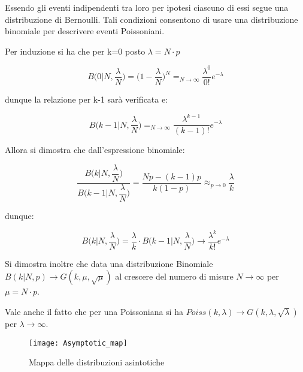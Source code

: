 \documentclass[11pt,a4paper]{book}
\begin{document}
Essendo gli eventi indipendenti tra loro per ipotesi ciascuno di essi segue una distribuzione di Bernoulli. Tali condizioni consentono di usare una distribuzione binomiale per descrivere eventi Poissoniani.

Per induzione si ha che per k=0 posto $\lambda = N \cdot p$

\begin{equation*}
	B \Big (0\vert N, \dfrac{\lambda}{N} \Big ) = \Big (1- \dfrac{\lambda}{N} \Big )^N =_{N \rightarrow \infty} \dfrac{\lambda^0}{0!}e^{-\lambda}
\end{equation*}

dunque la relazione per k-1 sar\`{a} verificata e:

\begin{equation*}
	B \Big (k-1\vert N,\frac{\lambda}{N} \Big ) =_{N \rightarrow \infty} \dfrac{\lambda^{k-1}}{(k-1)!} e^{- \lambda}
\end{equation*}

Allora si dimostra che dall'espressione binomiale:

\begin{equation*}
	\dfrac{B \Big (k  \vert N , \dfrac{\lambda}{N}\Big)}{B \Big(k-1 \vert N, \dfrac{\lambda}{N} \Big) } = \dfrac{Np- (k-1)p}{k(1-p)} \approx_{p \rightarrow 0} \dfrac{\lambda}{k}
\end{equation*}


 dunque:
 
 \begin{equation*}
 	B \Big (k  \vert N , \dfrac{\lambda}{N}\Big) = \dfrac{\lambda}{k} \cdot B \Big(k-1 \vert N, \dfrac{\lambda}{N} \Big) \rightarrow \dfrac{\lambda^{k}}{k!} e^{-\lambda}
 \end{equation*}
\newline

Si dimostra inoltre che data una distribuzione Binomiale $B(k \vert N,p) \rightarrow G(k,\mu,\sqrt{\mu})$ al crescere del numero di misure $N \rightarrow \infty $ per $\mu = N \cdot p$.
\newline

Vale anche il fatto che per una Poissoniana si ha $Poiss(k,\lambda) \rightarrow G(k,\lambda, \sqrt{\lambda})$ per $\lambda \rightarrow \infty $.

 
\begin{figure}[!ht]
\vspace{0.2in}
\texttt{[image: Asymptotic\_map]}	
\centering
\vspace{0.2in}
\caption{Mappa delle distribuzioni asintotiche}
\end{figure}
\end{document}
